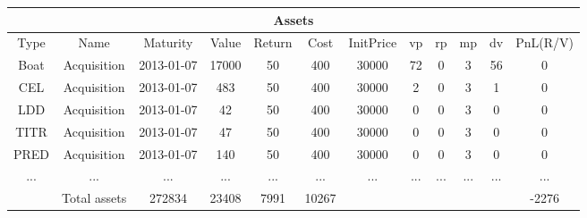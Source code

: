 \begin{longtable}{|c|c|c|c|c|c|c|c|c|c|c|c|}
\hline
\multicolumn{12}{|c|}{Assets} \\
\hline
Type & Name & Maturity & Value & Return & Cost & InitPrice & vp & rp & mp & dv & PnL(R/V)\\
\hline
Boat & Acquisition & 2013-01-07 & 17000 & 50 & 400 & 30000 & 72 & 0 & 3 & 56 & 0\\
\hline
CEL & Acquisition & 2013-01-07 & 483 & 50 & 400 & 30000 & 2 & 0 & 3 & 1 & 0\\
\hline
LDD & Acquisition & 2013-01-07 & 42 & 50 & 400 & 30000 & 0 & 0 & 3 & 0 & 0\\
\hline
TITR & Acquisition & 2013-01-07 & 47 & 50 & 400 & 30000 & 0 & 0 & 3 & 0 & 0\\
\hline
PRED & Acquisition & 2013-01-07 & 140 & 50 & 400 & 30000 & 0 & 0 & 3 & 0 & 0\\
\hline
 ... & ... & ... & ... & ... & ... & ... & ... & ... & ... & ... & ...\\
\hline
& Total assets & 272834 & 23408 & 7991 & 10267 & & & & & & -2276\\
\hline
\end{longtable}

